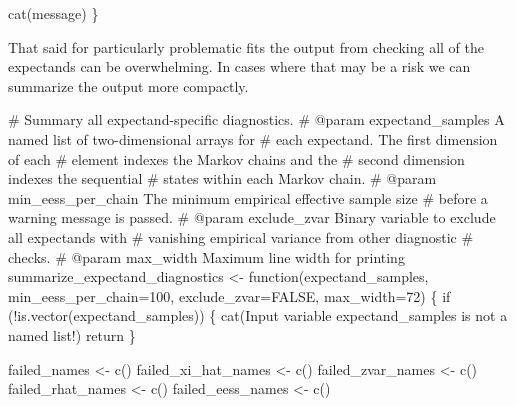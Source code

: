 \documentclass[
  letterpaper,
  DIV=11,
  numbers=noendperiod]{scrartcl}
\newenvironment{Shaded}{\begin{snugshade}}{\end{snugshade}}
\newcommand{\AttributeTok}[1]{\textcolor[rgb]{0.40,0.45,0.13}{#1}}
\newcommand{\CommentTok}[1]{\textcolor[rgb]{0.37,0.37,0.37}{#1}}
\newcommand{\ConstantTok}[1]{\textcolor[rgb]{0.56,0.35,0.01}{#1}}
\newcommand{\ControlFlowTok}[1]{\textcolor[rgb]{0.00,0.23,0.31}{#1}}
\newcommand{\DecValTok}[1]{\textcolor[rgb]{0.68,0.00,0.00}{#1}}
\newcommand{\FunctionTok}[1]{\textcolor[rgb]{0.28,0.35,0.67}{#1}}
\newcommand{\NormalTok}[1]{\textcolor[rgb]{0.00,0.23,0.31}{#1}}
\newcommand{\OtherTok}[1]{\textcolor[rgb]{0.00,0.23,0.31}{#1}}
\newcommand{\SpecialCharTok}[1]{\textcolor[rgb]{0.37,0.37,0.37}{#1}}
\newcommand{\StringTok}[1]{\textcolor[rgb]{0.13,0.47,0.30}{#1}}
\begin{document}
\begin{Shaded}
\begin{Highlighting}[]
  \FunctionTok{cat}\NormalTok{(message)}
\NormalTok{\}}
\end{Highlighting}
\end{Shaded}

That said for particularly problematic fits the output from checking all
of the expectands can be overwhelming. In cases where that may be a risk
we can summarize the output more compactly.

\begin{Shaded}
\begin{Highlighting}[]
\CommentTok{\# Summary all expectand{-}specific diagnostics.}
\CommentTok{\# @param expectand\_samples A named list of two{-}dimensional arrays for }
\CommentTok{\#                          each expectand.  The first dimension of each}
\CommentTok{\#                          element indexes the Markov chains and the }
\CommentTok{\#                          second dimension indexes the sequential }
\CommentTok{\#                          states within each Markov chain.}
\CommentTok{\# @param min\_eess\_per\_chain The minimum empirical effective sample size}
\CommentTok{\#                           before a warning message is passed.}
\CommentTok{\# @param exclude\_zvar Binary variable to exclude all expectands with}
\CommentTok{\#                     vanishing empirical variance from other diagnostic}
\CommentTok{\#                     checks.}
\CommentTok{\# @param max\_width Maximum line width for printing}
\NormalTok{summarize\_expectand\_diagnostics }\OtherTok{\textless{}{-}} \ControlFlowTok{function}\NormalTok{(expectand\_samples,}
                                            \AttributeTok{min\_eess\_per\_chain=}\DecValTok{100}\NormalTok{,}
                                            \AttributeTok{exclude\_zvar=}\ConstantTok{FALSE}\NormalTok{,}
                                            \AttributeTok{max\_width=}\DecValTok{72}\NormalTok{) \{}
  \ControlFlowTok{if}\NormalTok{ (}\SpecialCharTok{!}\FunctionTok{is.vector}\NormalTok{(expectand\_samples)) \{}
    \FunctionTok{cat}\NormalTok{(}\StringTok{\textquotesingle{}Input variable \textasciigrave{}expectand\_samples\textasciigrave{} is not a named list!\textquotesingle{}}\NormalTok{)}
\NormalTok{    return}
\NormalTok{  \}}

\NormalTok{  failed\_names }\OtherTok{\textless{}{-}} \FunctionTok{c}\NormalTok{()}
\NormalTok{  failed\_xi\_hat\_names }\OtherTok{\textless{}{-}} \FunctionTok{c}\NormalTok{()}
\NormalTok{  failed\_zvar\_names }\OtherTok{\textless{}{-}} \FunctionTok{c}\NormalTok{()}
\NormalTok{  failed\_rhat\_names }\OtherTok{\textless{}{-}} \FunctionTok{c}\NormalTok{()}
\NormalTok{  failed\_eess\_names }\OtherTok{\textless{}{-}} \FunctionTok{c}\NormalTok{()}


\end{Highlighting}
\end{Shaded}
\end{document}
